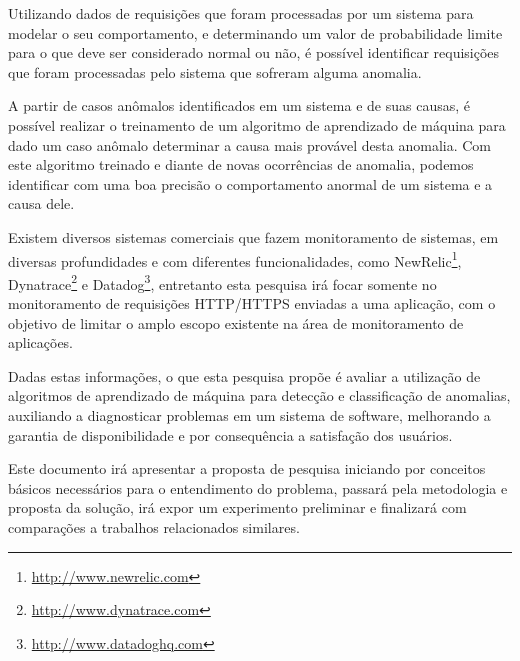 Utilizando dados de requisições que foram processadas por um sistema para modelar
o seu comportamento, e determinando um valor de probabilidade limite para o que deve
ser considerado normal ou não, é possível identificar requisições que foram
processadas pelo sistema que sofreram alguma anomalia.

A partir de casos anômalos identificados em um sistema e de suas causas, é possível
realizar o treinamento de um algoritmo de aprendizado de máquina para dado um caso
anômalo determinar a causa mais provável desta anomalia. Com este algoritmo treinado
e diante de novas ocorrências de anomalia, podemos identificar com uma boa precisão
o comportamento anormal de um sistema e a causa dele.

Existem diversos sistemas comerciais que fazem monitoramento de sistemas, em diversas
profundidades e com diferentes funcionalidades, como
NewRelic\footnote[1]{\url{http://www.newrelic.com}},
Dynatrace\footnote[2]{\url{http://www.dynatrace.com}}
e Datadog\footnote[3]{\url{http://www.datadoghq.com}}, entretanto esta pesquisa irá focar
somente no monitoramento de requisições HTTP/HTTPS enviadas a uma aplicação, com o
objetivo de limitar o amplo escopo existente na área de monitoramento de aplicações.

Dadas estas informações, o que esta pesquisa propõe é avaliar a utilização de
algoritmos de aprendizado de máquina para detecção e classificação de anomalias,
auxiliando a diagnosticar problemas em um sistema de software, melhorando a garantia
de disponibilidade e por consequência a satisfação dos usuários.

Este documento irá apresentar a proposta de pesquisa iniciando por conceitos básicos
necessários para o entendimento do problema, passará pela metodologia e proposta da
solução, irá expor um experimento preliminar e finalizará com comparações a trabalhos
relacionados similares.
